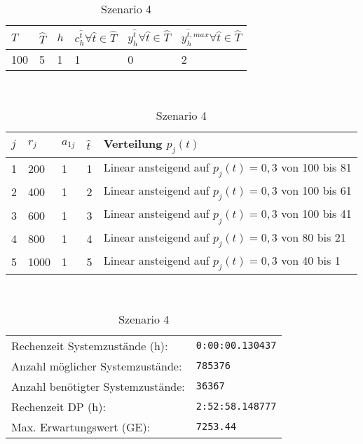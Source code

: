 \begin{table}[h!]
\renewcommand{\arraystretch}{1.5}
  \begin{center}
    \caption{Szenario 4}  \label{S4}
    \vspace*{3mm}
    \begin{tabular}{l l l l l l}   %
    $T$ & $\hat T$  & $h$ & $c_h^{\hat t}\forall \hat{t}\in{\hat T}$ & $y_h^{\hat t}\forall \hat{t}\in{\hat T}$  & $y_h^{{\hat t},max}\forall \hat{t}\in{\hat T}$  \\  \hline
100 & 5 & 1 & 1 & 0 & 2  \\ \hline
    \end{tabular} \\[3mm]
        \begin{tabular}{p{.5cm} p{.5cm} p{.5cm}  p{.5cm} p{9cm}}   %
    $j$ & $r_j$  & $a_{1j}$ & $\hat t$ & Verteilung $p_j(t)$ \\  \hline
1 & 200 & 1 & 1 & Linear ansteigend auf $p_j(t)=0,3$ von 100 bis 81   \\
2 & 400 & 1 & 2 & Linear ansteigend auf $p_j(t)=0,3$ von 100 bis 61  \\
3 & 600 & 1 & 3 & Linear ansteigend auf $p_j(t)=0,3$ von 100 bis 41  \\
4 & 800 & 1 & 4 & Linear ansteigend auf $p_j(t)=0,3$ von 80 bis 21  \\
5 & 1000 & 1 & 5 & Linear ansteigend auf $p_j(t)=0,3$ von 40 bis 1 \\
\hline
    \end{tabular} \\[3mm]
     \begin{tabular}{p{7cm}p{5cm}} \hline
     Rechenzeit Systemzustände (h): & \texttt{0:00:00.130437} \\
     Anzahl möglicher Systemzustände: & \texttt{785376} \\
     Anzahl benötigter Systemzustände: & \texttt{36367} \\ 
     Rechenzeit DP (h): & \texttt{2:52:58.148777} \\ 
          Max. Erwartungswert (GE): & \texttt{7253.44} \\ \hline
         \end{tabular} \\[3mm]
  \end{center}
\end{table}

